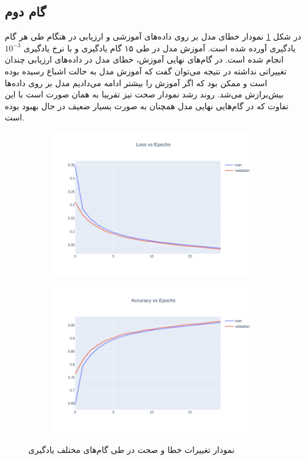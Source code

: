 \documentclass[12pt, a4paper]{article}
\begin{document}
\subsection*{گام دوم}

در شکل \ref{acc_loss_epoch} نمودار خطای مدل بر روی داده‌های آموزشی و ارزیابی در هنگام طی هر گام یادگیری
آورده شده است. آموزش مدل در طی ۱۵ گام یادگیری و با نرخ یادگیری $10^{-3}$ انجام شده است.
در گام‌های نهایی آموزش، خطای مدل در داده‌های ارزیابی چندان تغییراتی نداشته در نتیجه
می‌توان گفت که آموزش مدل به حالت اشباع رسیده بوده است و ممکن بود که اگر آموزش
را بیشتر ادامه می‌دادیم مدل بر روی داده‌ها بیش‌برازش می‌شد. روند رشد نمودار صحت نیز
تقریبا به همان صورت است با این تفاوت که در گام‌هایی نهایی مدل همچنان به صورت بسیار ضعیف
در حال بهبود بوده است.

\begin{figure}[h]
    \begin{subfigure}{0.45\linewidth}
        \centering
        \includegraphics[width=\linewidth]{images/loss_epoch.png}
    \end{subfigure}
    \begin{subfigure}{0.45\linewidth}
        \centering
        \includegraphics[width=\linewidth]{images/acc_epoch.png}
    \end{subfigure}
    \caption{نمودار تغییرات خطا و صحت در طی گام‌های مختلف یادگیری}
    \label{acc_loss_epoch}
\end{figure}
\end{document}
